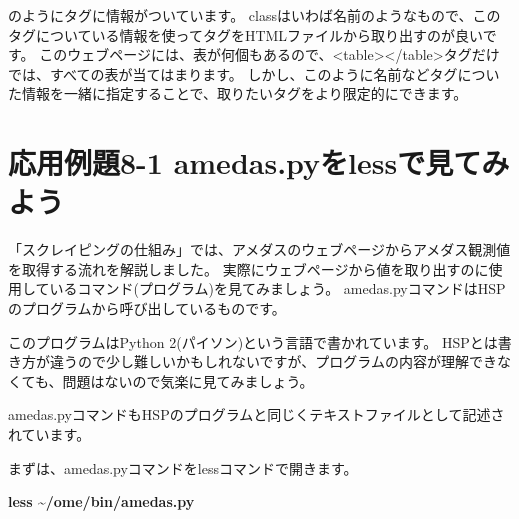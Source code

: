 \documentclass[a4paper,12pt,dvipdfmx]{jarticle}
\begin{document}
のようにタグに情報がついています。
classはいわば名前のようなもので、このタグについている情報を使ってタグをHTMLファイルから取り出すのが良いです。
このウェブページには、表が何個もあるので、{\textless}table{\textgreater}{\textless}/table{\textgreater}タグだけでは、すべての表が当てはまります。
しかし、このように名前などタグについた情報を一緒に指定することで、取りたいタグをより限定的にできます。


\bigskip


\bigskip

\clearpage\section{応用例題8-1 amedas.pyをlessで見てみよう}
「スクレイピングの仕組み」では、アメダスのウェブページからアメダス観測値を取得する流れを解説しました。
実際にウェブページから値を取り出すのに使用しているコマンド(プログラム)を見てみましょう。
amedas.pyコマンドはHSPのプログラムから呼び出しているものです。

このプログラムはPython
2(パイソン)という言語で書かれています。
HSPとは書き方が違うので少し難しいかもしれないですが、プログラムの内容が理解できなくても、問題はないので気楽に見てみましょう。


\bigskip

amedas.pyコマンドもHSPのプログラムと同じくテキストファイルとして記述されています。

まずは、amedas.pyコマンドをlessコマンドで開きます。


\bigskip

\textbf{less \~{}/ome/bin/amedas.py}
\end{document}
